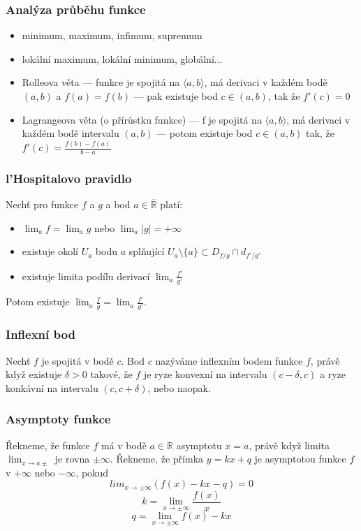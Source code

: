 \subsubsection*{Analýza průběhu funkce}
\begin{itemize}
	\item minimum, maximum, infimum, supremum
	\item lokální maximum, lokální minimum, globální...
	\item Rolleova věta --- funkce je spojitá na $\langle a,b\rangle$, má derivaci v každém bodě $(a,b)$ a $f(a) = f(b)$ --- pak existuje bod $c \in (a,b)$, tak že $f'(c) = 0$
	\item Lagrangeova věta (o přírůstku funkce) --- f je spojitá na $\langle a,b\rangle$, má derivaci v každém bodě intervalu $(a,b)$ --- potom existuje bod $c \in (a, b)$ tak, že $f'(c) = \frac{f(b) - f(a)}{b - a}$
\end{itemize}

\subsubsection*{l'Hospitalovo pravidlo}
Nechť pro funkce $f$ a $g$ a bod $a \in \overline{\mathbb{R}}$ platí:
\begin{itemize}
	\item $\lim_a f = \lim_a g$ nebo $\lim_a |g| = +\infty$
	\item existuje okolí $U_a$ bodu $a$ splňující $U_a \setminus \{a\} \subset D_{f/g} \cap d_{f'/g'}$
	\item existuje limita podílu derivací $\lim_a \frac{f'}{g'}$
\end{itemize}
Potom existuje $\lim_a \frac{f}{g} = \lim_a \frac{f'}{g'}$.

\subsubsection*{Inflexní bod}
Nechť $f$ je spojitá  v bodě $c$. Bod $c$ nazýváme inflexním bodem funkce $f$, právě když existuje $\delta > 0$ takové, že $f$ je ryze konvexní na intervalu $(c - \delta, c)$ a ryze konkávní na intervalu $(c, c + \delta)$, nebo naopak.

\subsubsection*{Asymptoty funkce}
Řekneme, že funkce $f$ má v bodě $a \in \mathbb{R}$ asymptotu $x = a$, právě když limita $\lim_{x\to a\pm}$ je rovna $\pm \infty$. Řekneme, že přímka $y = kx + q$ je asymptotou funkce $f$ v $+\infty$ nebo $-\infty$, pokud $$lim_{x\to\pm\infty} (f(x) - kx - q) = 0$$
$$k = \lim_{x\to\pm\infty} \frac{f(x)}{x}$$
$$q = \lim_{x\to\pm\infty} f(x) - kx$$